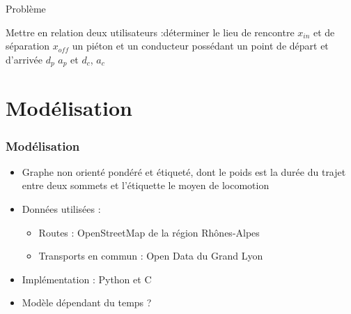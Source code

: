 \documentclass{beamer}
\begin{document}
\begin{frame}{Problème}

  Mettre en relation deux utilisateurs :déterminer le lieu de rencontre $x_{in}$ et de séparation $x_{off}$ un piéton et un conducteur possédant un point de départ et d'arrivée $d_p$ $a_p$ et $d_c$, $a_c$
  \begin{center}
  \end{center}



\end{frame}
\section{Modélisation}

\begin{frame}
  \frametitle{Modélisation}


  \begin{itemize}
    \item Graphe non orienté pondéré et étiqueté, dont le poids est la durée du trajet entre deux sommets et l'étiquette le moyen de locomotion
    \item Données utilisées :
          \begin{itemize}
            \item Routes : OpenStreetMap de la région Rhônes-Alpes
            \item Transports en commun : Open Data du Grand Lyon
          \end{itemize}
    \item Implémentation : Python et C
    \item Modèle dépendant du temps ?
  \end{itemize}
\end{frame}
\end{document}
